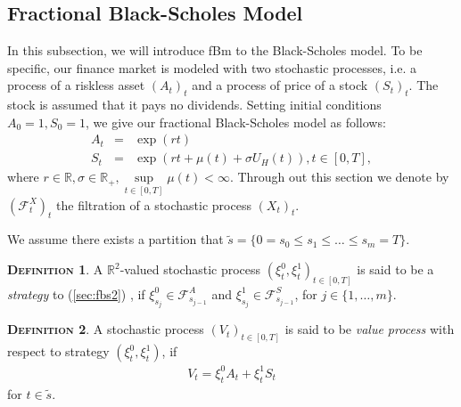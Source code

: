 \documentclass[a4paper, twoside, 11pt]{article}
\theoremstyle{definition}
\newtheorem{definition}{\scshape Definition}[section]
\begin{document}
  \subsection{Fractional Black-Scholes Model}
  In this subsection, we will introduce fBm to the Black-Scholes model. To be specific, our finance market is modeled with two stochastic processes, i.e. a process of a riskless asset $(A_t)_t$ and a process of price of a stock $(S_t)_t$.  The stock is assumed that it pays no dividends. Setting initial conditions $A_0=1, S_0=1$, we give our fractional Black-Scholes model as follows:
  \begin{eqnarray}
	A_t &=& \exp(rt)\nonumber\\
	S_t &=& \exp(rt + \mu(t) +\sigma U_H(t)), t\in [0, T],
	\label{sec:fbs2}
  \end{eqnarray}
  where  $r\in\mathbb{R}, \sigma\in\mathbb{R}_+, \sup\limits_{t\in[0, T]}\mu(t) < \infty$.
   Through out this section we denote by $(\mathcal{F}^X_t)_t$ the filtration of a stochastic process $(X_t)_t$. %

   We assume there exists a partition that $\tilde{s} = \{0=s_0\le s_1\le \dots\le s_m=T\}$.
  \begin{definition}
	A $\mathbb{R}^{2}$-valued stochastic process $(\xi_t^0, \xi_t^1)_{t\in [0, T]}$ is said to be a \emph{strategy} to (\ref{sec:fbs2}) , if $\xi_{s_j}^0 \in \mathcal{F}^A_{s_{j-1}}$ and $\xi_{s_j}^1 \in \mathcal{F}^S_{s_{j-1}}$, for $j \in \{1,\dots,m\}$.
  \end{definition}

  \begin{definition}
	A stochastic process $(V_t)_{t\in[0, T]}$ is said to be \emph{value process} with respect to strategy $(\xi_t^0, \xi_t^1)$, if 
	\begin{eqnarray*}
	  V_t =  \xi^0_t A_t + \xi^1_t S_t %
	\end{eqnarray*}
	for $t \in \tilde{s}$.
  \end{definition}

\end{document}
